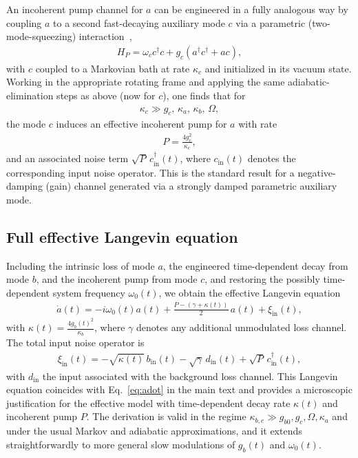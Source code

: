 \documentclass[a4paper,twocolumn,floatfix,10pt,superscriptaddress]%
{quantumarticle}
\begin{document}
An incoherent pump channel for $a$ can be engineered in a fully analogous way by coupling $a$ to a second fast-decaying auxiliary mode $c$ via a parametric (two-mode-squeezing) interaction~\cite{Roushan2017,Busnaina2024},
\begin{align}
H_P = \omega_c c^\dagger c + g_c (a^\dagger c^\dagger + a c),
\end{align}
with $c$ coupled to a Markovian bath at rate $\kappa_c$ and initialized in its vacuum state. Working in the appropriate rotating frame and applying the same adiabatic-elimination steps as above (now for $c$), one finds that for
\begin{align}
\kappa_c \gg g_c,\, \kappa_a,\, \kappa_b,\, \Omega,
\end{align}
the mode $c$ induces an effective incoherent pump for $a$ with rate
\begin{align}
P = \frac{4 g_c^2}{\kappa_c},
\end{align}
and an associated noise term $\sqrt{P}\, c_{\text{in}}^\dagger(t)$, where $c_{\text{in}}(t)$ denotes the corresponding input noise operator. This is the standard result for a negative-damping (gain) channel generated via a strongly damped parametric auxiliary mode.

\subsection{Full effective Langevin equation}

Including the intrinsic loss of mode $a$, the engineered time-dependent decay from mode $b$, and the incoherent pump from mode $c$, and restoring the possibly time-dependent system frequency $\omega_0(t)$, we obtain the effective Langevin equation
\begin{align}
\dot{a}(t)
= -i \omega_0(t) a(t)
+ \frac{P - (\gamma + \kappa(t))}{2}\, a(t)
+ \xi_\mathrm{in}(t),
\end{align}
with $\kappa(t) = \frac{4 g_b(t)^2}{\kappa_b}$, where $\gamma$ denotes any additional unmodulated loss channel. The total input noise operator is
\begin{align}
\xi_\mathrm{in}(t)
= -\sqrt{\kappa(t)}\, b_{\text{in}}(t)
  -\sqrt{\gamma}\, d_{\text{in}}(t)
  +\sqrt{P}\, c_{\text{in}}^\dagger(t),
\end{align}
with $d_{\text{in}}$ the input associated with the background loss channel. This Langevin equation coincides with Eq.~\eqref{eq:adot} in the main text and provides a microscopic justification for the effective model with time-dependent decay rate $\kappa(t)$ and incoherent pump $P$. The derivation is valid in the regime $\kappa_{b,c} \gg g_{b0}, g_c, \Omega, \kappa_a$ and under the usual Markov and adiabatic approximations, and it extends straightforwardly to more general slow modulations of $g_b(t)$ and $\omega_0(t)$. 
\end{document}
